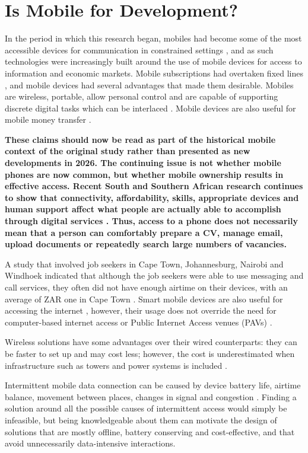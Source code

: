 \section{Is Mobile for Development?}

In the period in which this research began, mobiles had become some of the most accessible devices for communication in constrained settings \cite{bhavnani2008,gsma2014}, and as such technologies were increasingly built around the use of mobile devices for access to information and economic markets. Mobile subscriptions had overtaken fixed lines \cite{feldmann2003}, and mobile devices had several advantages that made them desirable. Mobiles are wireless, portable, allow personal control and are capable of supporting discrete digital tasks which can be interlaced \cite{donner2015}. Mobile devices are also useful for mobile money transfer \cite{donner2015}.

\textbf{These claims should now be read as part of the historical mobile context of the original study rather than presented as new developments in 2026. The continuing issue is not whether mobile phones are now common, but whether mobile ownership results in effective access. Recent South and Southern African research continues to show that connectivity, affordability, skills, appropriate devices and human support affect what people are actually able to accomplish through digital services \cite{mangadi2024,keskinen2022}. Thus, access to a phone does not necessarily mean that a person can comfortably prepare a CV, manage email, upload documents or repeatedly search large numbers of vacancies.}

A study that involved job seekers in Cape Town, Johannesburg, Nairobi and Windhoek indicated that although the job seekers were able to use messaging and call services, they often did not have enough airtime on their devices, with an average of ZAR one in Cape Town \cite{chepken2012tele}. Smart mobile devices are also useful for accessing the internet \cite{donner2013}, however, their usage does not override the need for computer-based internet access or Public Internet Access venues (PAVs) \cite{donner2013}.

Wireless solutions have some advantages over their wired counterparts: they can be faster to set up and may cost less; however, the cost is underestimated when infrastructure such as towers and power systems is included \cite{feldmann2003}.

Intermittent mobile data connection can be caused by device battery life, airtime balance, movement between places, changes in signal and congestion \cite{donner2015}. Finding a solution around all the possible causes of intermittent access would simply be infeasible, but being knowledgeable about them can motivate the design of solutions that are mostly offline, battery conserving and cost-effective, and that avoid unnecessarily data-intensive interactions.

